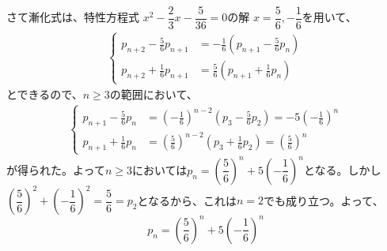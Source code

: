 さて漸化式は、特性方程式 $x^2-\dfrac{2}{3}x-\dfrac{5}{36}=0$の解 $x=\dfrac{5}{6}, -\dfrac{1}{6}$を用いて、
\begin{align*}
 \left\{
 \begin{aligned}
  p_{n+2}-\frac{5}{6}p_{n+1}&=-\frac{1}{6}\left(p_{n+1}-\frac{5}{6}p_n\right) \\
  p_{n+2}+\frac{1}{6}p_{n+1}&= \frac{5}{6}\left(p_{n+1}+\frac{1}{6}p_n\right)
 \end{aligned}
 \right.
\end{align*}
とできるので、$n\ge 3$の範囲において、
\begin{align*}
 \left\{
 \begin{aligned}
  p_{n+1}-\frac{5}{6}p_n&=\left(-\frac{1}{6}\right)^{n-2}\!\!\left(p_3-\frac{5}{6}p_2\right)=-5\left(-\frac{1}{6}\right)^n \\
  p_{n+1}+\frac{1}{6}p_n&=\left(\frac{5}{6}\right)^{n-2}\!\!\left(p_3+\frac{1}{6}p_2\right)=\left(\frac{5}{6}\right)^n
 \end{aligned}
 \right. 
\end{align*}
が得られた。よって$n\ge 3$においては$p_n=\left(\dfrac{5}{6}\right)^n+5\left(-\dfrac{1}{6}\right)^n$となる。しかし$\left(\dfrac{5}{6}\right)^2+\left(-\dfrac{1}{6}\right)^2=\dfrac{5}{6}=p_2$となるから、これは$n=2$でも成り立つ。よって、
\[ p_n=\left(\frac{5}{6}\right)^n+5\left(-\frac{1}{6}\right)^n \]